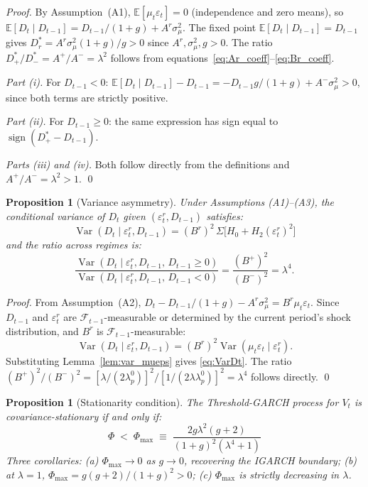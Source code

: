 \documentclass[12pt,a4paper]{article}
\newtheorem{proposition}[theorem]{Proposition}
\theoremstyle{definition}
\begin{document}
\begin{proof}
By Assumption~(A1), $\mathbb{E}[\mu_t\varepsilon_t] = 0$ (independence
and zero means), so $\mathbb{E}[D_t \mid D_{t-1}] = D_{t-1}/(1+g) +
A^r\sigma^2_\mu$. The fixed point $\mathbb{E}[D_t \mid D_{t-1}] = D_{t-1}$
gives $D^*_r = A^r\sigma^2_\mu(1+g)/g > 0$ since $A^r, \sigma^2_\mu,
g > 0$. The ratio $D^*_+/D^*_- = A^+/A^- = \lambda^2$ follows from
equations~\eqref{eq:Ar_coeff}--\eqref{eq:Br_coeff}.

\textit{Part (i).} For $D_{t-1} < 0$: $\mathbb{E}[D_t \mid D_{t-1}]
- D_{t-1} = -D_{t-1}g/(1+g) + A^-\sigma^2_\mu > 0$, since both
terms are strictly positive.

\textit{Part (ii).} For $D_{t-1} \geq 0$: the same expression has sign
equal to $\operatorname{sign}(D^*_+ - D_{t-1})$.

\textit{Parts (iii) and (iv).} Both follow directly from the definitions
and $A^+/A^- = \lambda^2 > 1$.
\qed
\end{proof}

\begin{proposition}[Variance asymmetry]
\label{prop:var_asym}\label{prop:Vt_ratio}
Under Assumptions (A1)--(A3), the conditional variance of $D_t$
given $(\varepsilon^r_t, D_{t-1})$ satisfies:
\begin{equation}
  \operatorname{Var}(D_t \mid \varepsilon^r_t, D_{t-1})
  = (B^r)^2\,\Sigma\bigl[H_0 + H_2(\varepsilon^r_t)^2\bigr]
  \label{eq:VarDt}
\end{equation}
and the ratio across regimes is:
\[
\frac{\operatorname{Var}(D_t \mid \varepsilon^r_t, D_{t-1},\,
  D_{t-1}\geq0)}
     {\operatorname{Var}(D_t \mid \varepsilon^r_t, D_{t-1},\,
  D_{t-1}<0)}
= \frac{(B^+)^2}{(B^-)^2} = \lambda^4.
\]
\end{proposition}

\begin{proof}
From Assumption~(A2), $D_t - D_{t-1}/(1+g) - A^r\sigma^2_\mu =
B^r\mu_t\varepsilon_t$. Since $D_{t-1}$ and $\varepsilon^r_t$ are
$\mathcal{F}_{t-1}$-measurable or determined by the current period's
shock distribution, and $B^r$ is $\mathcal{F}_{t-1}$-measurable:
\[
\operatorname{Var}(D_t \mid \varepsilon^r_t, D_{t-1})
= (B^r)^2\operatorname{Var}(\mu_t\varepsilon_t \mid \varepsilon^r_t).
\]
Substituting Lemma~\ref{lem:var_mueps} gives \eqref{eq:VarDt}. The
ratio $(B^+)^2/(B^-)^2 = [\lambda/(2\lambda^0_p)]^2 /
[1/(2\lambda\lambda^0_p)]^2 = \lambda^4$ follows directly.
\qed
\end{proof}

\begin{proposition}[Stationarity condition]
\label{prop:stationarity}
The Threshold-GARCH process for $V_t$ is covariance-stationary if
and only if:
\begin{equation}
  \Phi \;<\; \Phi_{\max} \;\equiv\;
  \frac{2g\lambda^2(g+2)}{(1+g)^2(\lambda^4+1)}
  \label{eq:Phi_max_proof}
\end{equation}
Three corollaries: (a) $\Phi_{\max} \to 0$ as $g \to 0$, recovering
the IGARCH boundary; (b) at $\lambda = 1$, $\Phi_{\max} =
g(g+2)/(1+g)^2 > 0$; (c) $\Phi_{\max}$ is strictly decreasing
in $\lambda$.
\end{proposition}
\end{document}
